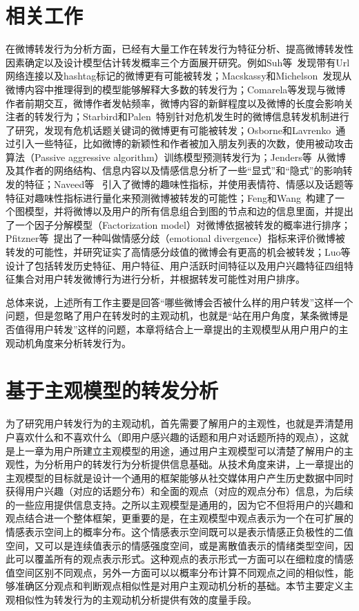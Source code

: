 \section{相关工作}
\label{ch6_relatedwork}
在微博转发行为分析方面，已经有大量工作在转发行为特征分析、提高微博转发性因素确定以及设计模型估计转发概率三个方面展开研究。例如Suh等~发现带有Url网络连接以及hashtag标记的微博更有可能被转发；Macskassy和Michelson~发现从微博内容中推理得到的模型能够解释大多数的转发行为；Comarela等发现与微博作者前期交互，微博作者发帖频率，微博内容的新鲜程度以及微博的长度会影响关注者的转发行为；Starbird和Palen~特别针对危机发生时的微博信息转发机制进行了研究，发现有危机话题关键词的微博更有可能被转发；Osborne和Lavrenko~通过引入一些特征，比如微博的新颖性和作者被加入朋友列表的次数，使用被动攻击算法（Passive aggressive algorithm）训练模型预测转发行为；Jenders等~从微博及其作者的网络结构、信息内容以及情感信息分析了一些“显式”和“隐式”的影响转发的特征；Naveed等~
引入了微博的趣味性指标，并使用表情符、情感以及话题等特征对趣味性指标进行量化来预测微博被转发的可能性；Feng和Wang~构建了一个图模型，并将微博以及用户的所有信息组合到图的节点和边的信息里面，并提出了一个因子分解模型（Factorization model）对微博依据被转发的概率进行排序；Pfitzner等~提出了一种叫做情感分歧（emotional divergence）指标来评价微博被转发的可能性，并研究证实了高情感分歧值的微博会有更高的机会被转发；Luo等设计了包括转发历史特征、用户特征、用户活跃时间特征以及用户兴趣特征四组特征集合对用户转发微博行为进行分析，并根据转发可能性对用户排序。

总体来说，上述所有工作主要是回答“哪些微博会否被什么样的用户转发”这样一个问题，但是忽略了用户在转发时的主观动机，也就是“站在用户角度，某条微博是否值得用户转发”这样的问题，本章将结合上一章提出的主观模型从用户用户的主观动机角度来分析转发行为。

\section{基于主观模型的转发分析}
为了研究用户转发行为的主观动机，首先需要了解用户的主观性，也就是弄清楚用户喜欢什么和不喜欢什么（即用户感兴趣的话题和用户对话题所持的观点），这就是上一章为用户所建立主观模型的用途，通过用户主观模型可以清楚了解用户的主观性，为分析用户的转发行为分析提供信息基础。从技术角度来讲，上一章提出的主观模型的目标就是设计一个通用的框架能够从社交媒体用户产生历史数据中同时获得用户兴趣（对应的话题分布）和全面的观点（对应的观点分布）信息，为后续的一些应用提供信息支持。之所以主观模型是通用的，因为它不但将用户的兴趣和观点结合进一个整体框架，更重要的是，在主观模型中观点表示为一个在可扩展的情感表示空间上的概率分布。这个情感表示空间既可以是表示情感正负极性的二值空间，又可以是连续值表示的情感强度空间，或是离散值表示的情绪类型空间，因此可以覆盖所有的观点表示形式。这种观点的表示形式一方面可以在细粒度的情感值空间区别不同观点，另外一方面可以以概率分布计算不同观点之间的相似性，能够准确区分观点和判断观点相似性是对用户主观动机分析的基础。本节主要定义主观相似性为转发行为的主观动机分析提供有效的度量手段。


